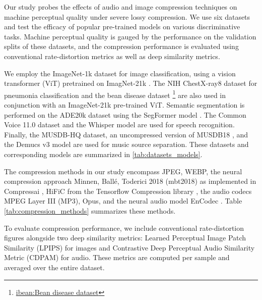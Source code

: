 \documentclass[10pt,twocolumn,letterpaper]{article}
\begin{document}
Our study probes the effects of audio and image compression techniques on machine perceptual quality under severe lossy compression. We use six datasets and test the efficacy of popular pre-trained models on various discriminative tasks. Machine perceptual quality is gauged by the performance on the validation splits of these datasets, and the compression performance is evaluated using conventional rate-distortion metrics as well as deep similarity metrics.

We employ the ImageNet-1k dataset for image classification, using a vision transformer (ViT) \cite{dosovitskiy2020image} pretrained on ImagNet-21k . The NIH ChestX-ray8 dataset \cite{wang2017chestx} for pneumonia classification and the bean disease dataset \footnote{\href{https://github.com/AI-Lab-Makerere/ibean}{ibean:Bean disease dataset}} are also used in conjunction with an ImageNet-21k pre-trained ViT. Semantic segmentation is performed on the ADE20k dataset \cite{zhou2017scene} using the SegFormer model \cite{xie2021segformer}. The Common Voice 11.0 dataset \cite{ardila2020common} and the Whisper model \cite{radford2023robust} are used for speech recognition. Finally, the MUSDB-HQ dataset, an uncompressed version of MUSDB18 \cite{rafii2017musdb18}, and the Demucs v3 model \cite{defossez2021hybrid} are used for music source separation. These datasets and corresponding models are summarized in \ref{tab:datasets_models}.

The compression methods in our study encompass JPEG, WEBP, the neural compression approach Minnen, Ballé, Toderici 2018 (mbt2018) \cite{minnen2018joint} as implemented in Compressai \cite{begaint2020compressai}, HiFiC \cite{mentzer2020high} from the Tensorflow Compression library \cite{balle2022tensorflow}, the audio codecs MPEG Layer III (MP3), Opus, and the neural audio model EnCodec \cite{defossez2022high}. Table \ref{tab:compression_methods} summarizes these methods.

To evaluate compression performance, we include conventional rate-distortion figures alongside two deep similarity metrics: Learned Perceptual Image Patch Similarity (LPIPS) \cite{zhang2018unreasonable} for images and Contrastive Deep Perceptual Audio Similarity Metric (CDPAM) \cite{manocha2021cdpam} for audio. These metrics are computed per sample and averaged over the entire dataset.
\end{document}
